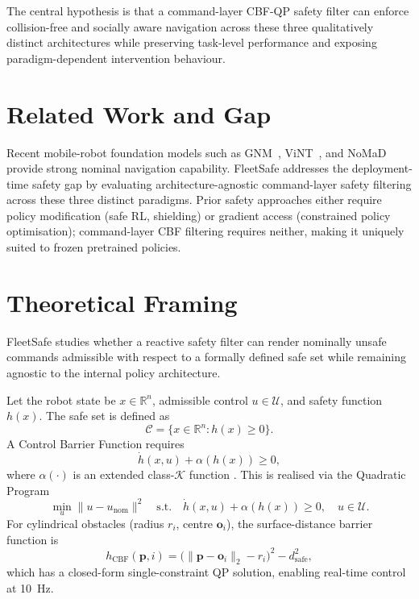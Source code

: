 \documentclass[12pt,a4paper]{article}
\begin{document}
The central hypothesis is that a command-layer CBF-QP safety filter can enforce
collision-free and socially aware navigation across these three qualitatively
distinct architectures while preserving task-level performance and exposing
paradigm-dependent intervention behaviour.

\section{Related Work and Gap}
\label{sec:related}

Recent mobile-robot foundation models such as GNM~\cite{shah2023gnm},
ViNT~\cite{majumdar2023vint}, and NoMaD~\cite{sridhar2024nomad} provide strong
nominal navigation capability. FleetSafe addresses the deployment-time safety
gap by evaluating architecture-agnostic command-layer safety filtering across
these three distinct paradigms. Prior safety approaches either require policy
modification (safe RL, shielding) or gradient access (constrained policy
optimisation); command-layer CBF filtering requires neither, making it
uniquely suited to frozen pretrained policies.

\section{Theoretical Framing}
\label{sec:theory}

FleetSafe studies whether a reactive safety filter can render nominally unsafe
commands admissible with respect to a formally defined safe set while remaining
agnostic to the internal policy architecture.

Let the robot state be $x \in \mathbb{R}^n$, admissible control
$u \in \mathcal{U}$, and safety function $h(x)$. The safe set is defined as
\[
  \mathcal{C} = \{x \in \mathbb{R}^n : h(x) \geq 0\}.
\]
A Control Barrier Function requires
\[
  \dot{h}(x,u) + \alpha(h(x)) \geq 0,
\]
where $\alpha(\cdot)$ is an extended class-$\mathcal{K}$ function
\cite{ames2019cbf}. This is realised via the Quadratic Program
\[
  \min_{u} \|u - u_{\text{nom}}\|^2
  \quad \text{s.t.}\quad
  \dot{h}(x,u) + \alpha(h(x)) \geq 0,\quad u \in \mathcal{U}.
\]
For cylindrical obstacles (radius $r_i$, centre $\mathbf{o}_i$), the
surface-distance barrier function is
\[
  h_{\text{CBF}}(\mathbf{p},i)
  = \bigl(\|\mathbf{p}-\mathbf{o}_i\|_2 - r_i\bigr)^2 - d_{\text{safe}}^2,
\]
which has a closed-form single-constraint QP solution, enabling real-time
control at \SI{10}{\hertz}.
\end{document}

